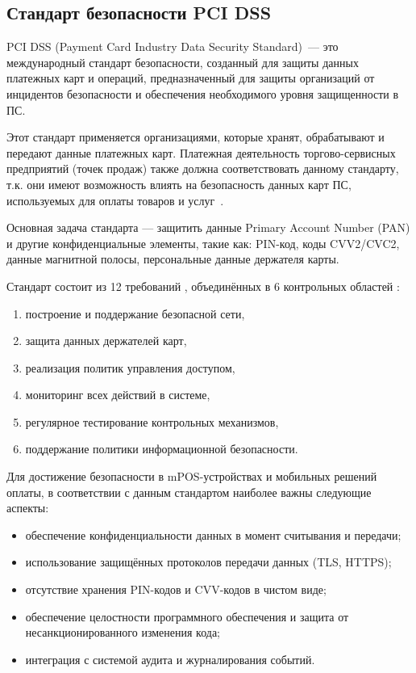 \subsection{Стандарт безопасности PCI DSS}

PCI DSS (Payment Card Industry Data Security Standard)~--- это международный стандарт безопасности, созданный для защиты данных платежных карт и операций, предназначенный для защиты организаций от инцидентов безопасности и обеспечения необходимого уровня защищенности в ПС.
 
Этот стандарт применяется организациями, которые хранят, обрабатывают и передают данные платежных карт.
Платежная деятельность торгово-сервисных предприятий (точек продаж) также должна соответствовать данному стандарту, т.к. они имеют возможность влиять на безопасность данных карт ПС, используемых для оплаты товаров и услуг~\cite{nspk_security}.

Основная задача стандарта — защитить данные Primary Account Number (PAN) и другие конфиденциальные элементы, такие как: PIN-код, коды CVV2/CVC2, данные магнитной полосы, персональные данные держателя карты.

Стандарт состоит из 12 требований , объединённых в 6 контрольных областей :

\begin{enumerate}
    \item построение и поддержание безопасной сети,
    \item защита данных держателей карт,
    \item реализация политик управления доступом,
    \item мониторинг всех действий в системе,
    \item регулярное тестирование контрольных механизмов,
    \item поддержание политики информационной безопасности.
\end{enumerate}

Для достижение безопасности в mPOS-устройствах и мобильных решений оплаты, в соответствии с данным стандартом наиболее важны следующие аспекты:

\begin{itemize}
    \item обеспечение конфиденциальности данных в момент считывания и передачи;
    \item использование защищённых протоколов передачи данных (TLS, HTTPS);
    \item отсутствие хранения PIN-кодов и CVV-кодов в чистом виде;
    \item обеспечение целостности программного обеспечения и защита от несанкционированного изменения кода;
    \item интеграция с системой аудита и журналирования событий.
\end{itemize}

